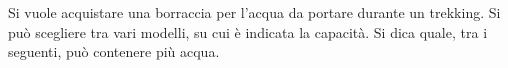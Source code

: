 Si vuole acquistare una borraccia per l'acqua 
da portare durante un trekking. 
Si può scegliere tra vari modelli, su cui è indicata la capacità. 
Si dica quale, tra i seguenti, può contenere più acqua.
